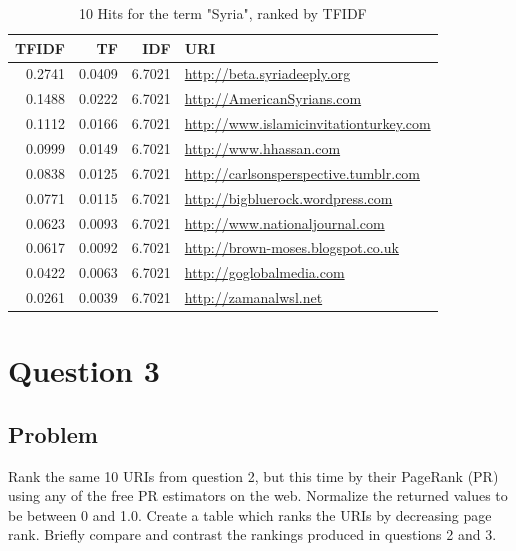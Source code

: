 \documentclass[letterpaper,11pt]{report}
\begin{document}
\begin{savenotes}
\begin{table}
	\centering
    \begin{tabular}{|r|r|r||l|}
    \hline
    TFIDF & TF     & IDF & URI                            \\ \hline
		0.2741 & 0.0409 & 6.7021 & \url{http://beta.syriadeeply.org}           \\ \hline
	  0.1488 & 0.0222 & 6.7021 & \url{http://AmericanSyrians.com}            \\ \hline
    0.1112 & 0.0166 & 6.7021 & \url{http://www.islamicinvitationturkey.com} \\ \hline				
    0.0999 & 0.0149 & 6.7021 & \url{http://www.hhassan.com}                \\ \hline
    0.0838 & 0.0125 & 6.7021 & \url{http://carlsonsperspective.tumblr.com} \\ \hline
    0.0771 & 0.0115 & 6.7021 & \url{http://bigbluerock.wordpress.com}      \\ \hline						
    0.0623 & 0.0093 & 6.7021 & \url{http://www.nationaljournal.com}        \\ \hline
    0.0617 & 0.0092 & 6.7021 & \url{http://brown-moses.blogspot.co.uk}     \\ \hline		
    0.0422 & 0.0063 & 6.7021 & \url{http://goglobalmedia.com}              \\ \hline
    0.0261 & 0.0039 & 6.7021 & \url{http://zamanalwsl.net}                 \\ \hline
    \end{tabular}
    \caption {10 Hits for the term "Syria", ranked by TFIDF}
			\label{tab:TFIDF-Rank}
\end{table}


\section{Question 3}
\subsection{Problem}Rank the same 10 URIs from question 2, but this time by their PageRank (PR) using any of the free PR estimators on the web. Normalize the returned values to be between 0 and 1.0. Create a table which ranks the URIs by decreasing page rank. Briefly compare and contrast the rankings produced in questions 2 and 3.


\end{savenotes}
\end{document}
